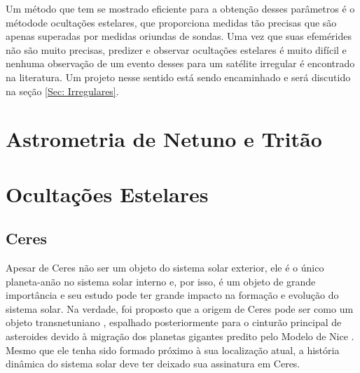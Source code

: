 \documentclass[12pt,a4paper]{monografia}
\begin{document}
Um método que tem se mostrado eficiente para a obtenção desses parâmetros é o métodode ocultações estelares, que proporciona medidas tão precisas que são apenas superadas por medidas oriundas de sondas. Uma vez que suas efemérides não são muito precisas, predizer e observar ocultações estelares é muito difícil e nenhuma observação de um evento desses para um satélite irregular é encontrado na literatura. Um projeto nesse sentido está sendo encaminhado e será discutido na seção \ref{Sec: Irregulares}.


\chapter{Astrometria de Netuno e Tritão}
\label{Cap: Netuno}


\chapter{Ocultações Estelares}
\label{Cap: observacoes}



\section{Ceres}
\label{Sec: Ceres}

\indent \indent Apesar de Ceres não ser um objeto do sistema solar exterior, ele é o único planeta-anão no sistema solar interno e, por isso, é um objeto de grande importância e seu estudo pode ter grande impacto na formação e evolução do sistema solar. Na verdade, foi proposto que a origem de Ceres pode ser como um objeto transnetuniano \citep{McKinnon2012}, espalhado posteriormente para o cinturão principal de asteroides devido à migração dos planetas gigantes predito pelo Modelo de Nice \citep{Gomes2005}. Mesmo que ele tenha sido formado próximo à sua localização atual, a história dinâmica do sistema solar deve ter deixado sua assinatura em Ceres.
\end{document}
